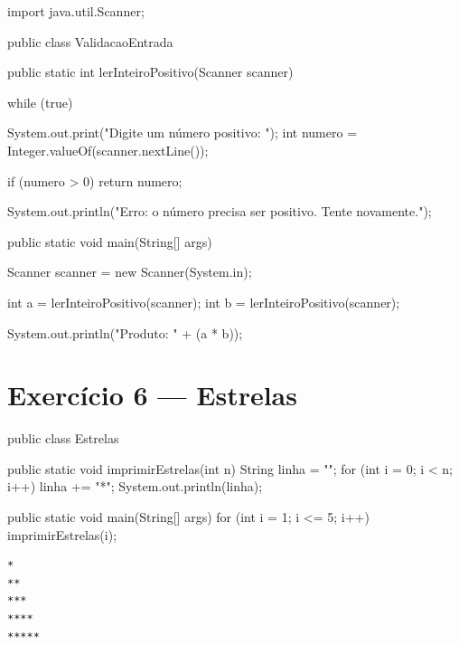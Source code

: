 \documentclass[11pt,a4paper]{article}
\begin{document}
\begin{javacode}
import java.util.Scanner;

public class ValidacaoEntrada {

    public static int lerInteiroPositivo(Scanner scanner) {
        while (true) {
            System.out.print("Digite um número positivo: ");
            int numero = Integer.valueOf(scanner.nextLine());

            if (numero > 0) {
                return numero;
            }

            System.out.println("Erro: o número precisa ser positivo. Tente novamente.");
        }
    }

    public static void main(String[] args) {
        Scanner scanner = new Scanner(System.in);

        int a = lerInteiroPositivo(scanner);
        int b = lerInteiroPositivo(scanner);

        System.out.println("Produto: " + (a * b));
    }
}
\end{javacode}

\section{Exercício 6 --- Estrelas}

\begin{javacode}
public class Estrelas {

    public static void imprimirEstrelas(int n) {
        String linha = "";
        for (int i = 0; i < n; i++) {
            linha += "*";
        }
        System.out.println(linha);
    }

    public static void main(String[] args) {
        for (int i = 1; i <= 5; i++) {
            imprimirEstrelas(i);
        }
    }
}
\end{javacode}

\begin{destaque}[Saída]
\begin{verbatim}
*
**
***
****
*****
\end{verbatim}
\end{destaque}
\end{document}
